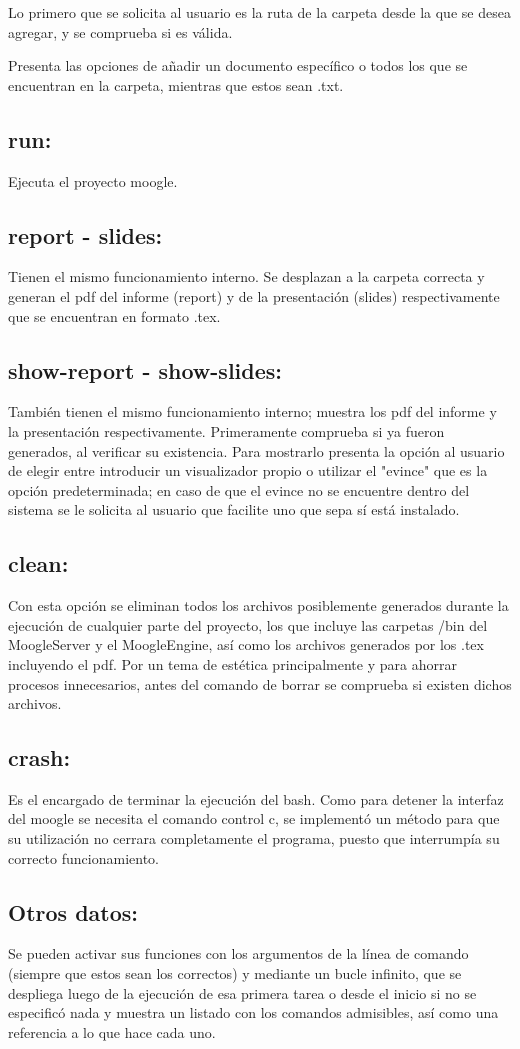 \documentclass[a4paper,12pt,]{article}
\begin{document}
Lo primero que se solicita al usuario es la ruta de la carpeta desde la que se desea agregar, y se comprueba si 
es válida.

Presenta las opciones de añadir un documento específico o todos los que se encuentran en la carpeta, mientras que 
estos sean .txt.

\subsection*{run: }
Ejecuta el proyecto moogle.

\subsection*{report - slides: }
Tienen el mismo funcionamiento interno. Se desplazan a la carpeta correcta y generan el pdf del informe (report) y de 
la presentación (slides) respectivamente que se encuentran en formato .tex.

\subsection*{show-report - show-slides: }
También tienen el mismo funcionamiento interno; muestra los pdf del informe y la presentación respectivamente. 
Primeramente comprueba si ya fueron generados, al verificar su existencia. Para mostrarlo presenta la opción al 
usuario de elegir entre introducir un visualizador propio o utilizar el "evince" que es la opción predeterminada; 
en caso de que el evince no se encuentre dentro del sistema se le solicita al usuario que facilite uno que sepa sí 
está instalado.

\subsection*{clean: }
Con esta opción se eliminan todos los archivos posiblemente generados durante la ejecución de cualquier parte del 
proyecto, los que incluye las carpetas /bin del MoogleServer y el MoogleEngine, así como los archivos generados por 
los .tex incluyendo el pdf. Por un tema de estética principalmente y para ahorrar procesos innecesarios, antes del 
comando de borrar se comprueba si existen dichos archivos.

\subsection*{crash: }
Es el encargado de terminar la ejecución del bash. Como para detener la interfaz del moogle se necesita el comando 
control c, se implementó un método para que su utilización no cerrara completamente el programa, puesto que interrumpía 
su correcto funcionamiento.

\subsection*{Otros datos: }
Se pueden activar sus funciones con los argumentos de la línea de comando (siempre que estos sean los correctos) y mediante un 
bucle infinito, que se despliega luego de la ejecución de esa primera tarea o desde el inicio si no se especificó nada y 
muestra un listado con los comandos admisibles, así como una referencia a lo que hace cada uno.
\end{document}

